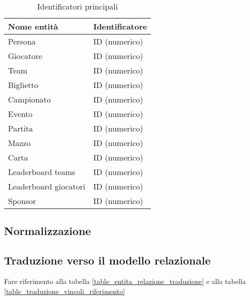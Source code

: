 \documentclass{article}
\begin{document}
\begin{table}[H]
    \centering
    \begin{tabularx}{\textwidth} { |X|X| }
    \hline
    \textbf{Nome entità}   & \textbf{Identificatore} \\ \hline
    Persona & ID (numerico) \\ \hline
    Giocatore & ID (numerico) \\ \hline %
    Team & ID (numerico) \\ \hline
    Biglietto & ID (numerico) \\ \hline
    Campionato & ID (numerico) \\ \hline
    Evento & ID (numerico) \\ \hline
    Partita & ID (numerico) \\ \hline
    Mazzo & ID (numerico) \\ \hline
    Carta & ID (numerico) \\ \hline
    Leaderboard teams & ID (numerico) \\ \hline
    Leaderboard giocatori & ID (numerico) \\ \hline
    Sponsor & ID (numerico) \\ \hline
    \end{tabularx}
\caption{Identificatori principali}
\end{table}


\subsection{Normalizzazione}



\subsection{Traduzione verso il modello relazionale}

Fare riferimento alla tabella \ref{table_entita_relazione_traduzione} e alla tabella \ref{table_traduzione_vincoli_riferimento}
\end{document}
